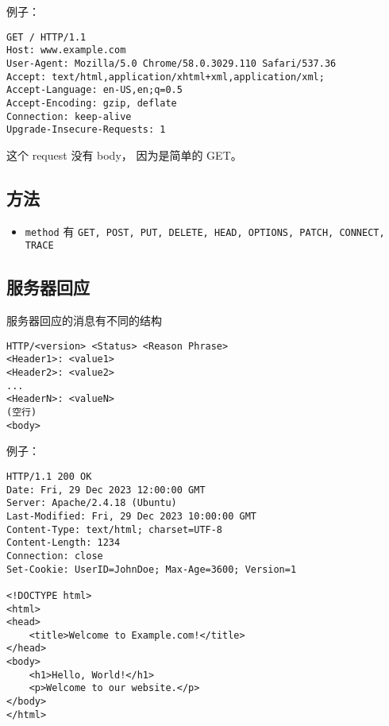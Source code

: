 例子：
\begin{lstlisting}[language=none]
GET / HTTP/1.1
Host: www.example.com
User-Agent: Mozilla/5.0 Chrome/58.0.3029.110 Safari/537.36
Accept: text/html,application/xhtml+xml,application/xml;
Accept-Language: en-US,en;q=0.5
Accept-Encoding: gzip, deflate
Connection: keep-alive
Upgrade-Insecure-Requests: 1
\end{lstlisting}
这个 request 没有 body， 因为是简单的 GET。

\subsection{方法}
\begin{itemize}
\item \verb|method| 有 \verb|GET, POST, PUT, DELETE, HEAD, OPTIONS, PATCH, CONNECT, TRACE|
\end{itemize}


\subsection{服务器回应}
服务器回应的消息有不同的结构
\begin{lstlisting}[language=none]
HTTP/<version> <Status> <Reason Phrase>
<Header1>: <value1>
<Header2>: <value2>
...
<HeaderN>: <valueN>
(空行)
<body>
\end{lstlisting}

例子：
\begin{lstlisting}[language=none]
HTTP/1.1 200 OK
Date: Fri, 29 Dec 2023 12:00:00 GMT
Server: Apache/2.4.18 (Ubuntu)
Last-Modified: Fri, 29 Dec 2023 10:00:00 GMT
Content-Type: text/html; charset=UTF-8
Content-Length: 1234
Connection: close
Set-Cookie: UserID=JohnDoe; Max-Age=3600; Version=1

<!DOCTYPE html>
<html>
<head>
    <title>Welcome to Example.com!</title>
</head>
<body>
    <h1>Hello, World!</h1>
    <p>Welcome to our website.</p>
</body>
</html>
\end{lstlisting}

